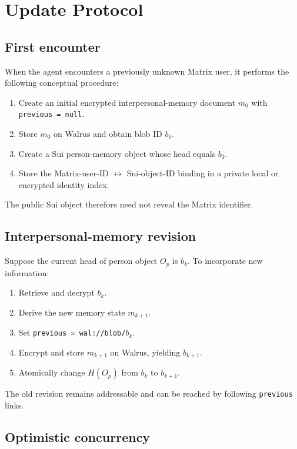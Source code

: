 \documentclass[11pt]{article}
\begin{document}
\section{Update Protocol}

\subsection{First encounter}

When the agent encounters a previously unknown Matrix user, it performs the following conceptual procedure:

\begin{enumerate}[nosep]
    \item Create an initial encrypted interpersonal-memory document $m_0$ with \texttt{previous = null}.
    \item Store $m_0$ on Walrus and obtain blob ID $b_0$.
    \item Create a Sui person-memory object whose head equals $b_0$.
    \item Store the Matrix-user-ID $\leftrightarrow$ Sui-object-ID binding in a private local or encrypted identity index.
\end{enumerate}

The public Sui object therefore need not reveal the Matrix identifier.

\subsection{Interpersonal-memory revision}

Suppose the current head of person object $O_p$ is $b_k$. To incorporate new information:

\begin{enumerate}[nosep]
    \item Retrieve and decrypt $b_k$.
    \item Derive the new memory state $m_{k+1}$.
    \item Set \texttt{previous = wal://blob/$b_k$}.
    \item Encrypt and store $m_{k+1}$ on Walrus, yielding $b_{k+1}$.
    \item Atomically change $H(O_p)$ from $b_k$ to $b_{k+1}$.
\end{enumerate}

The old revision remains addressable and can be reached by following \texttt{previous} links.

\subsection{Optimistic concurrency}
\end{document}
